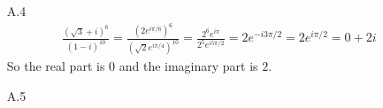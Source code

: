 \documentclass[../../Solutions.tex]{subfiles}
\begin{document}
\begin{itemize}
	\item [A.4] 
		\begin{equation*} \begin{split}
			\frac{(\sqrt{3}+i)^6}{(1-i)^{10}} = \frac{(2e^{i\pi/6})^6}{(\sqrt{2}e^{i\pi/4})^{10}}
				 = \frac{2^6e^{i\pi}}{2^5e^{i5\pi/2}} = 2e^{-i3\pi/2} = 2e^{i\pi/2} = 0+2i
		\end{split} \end{equation*}
		So the real part is $0$ and the imaginary part is $2$.
		
	\item [A.5]
\end{itemize}
\end{document}
